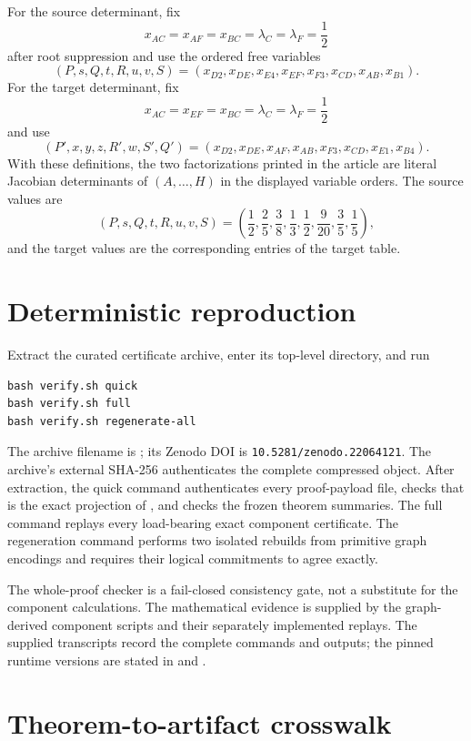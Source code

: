 \documentclass[11pt]{article}
\begin{document}
For the source determinant, fix
\[
x_{AC}=x_{AF}=x_{BC}=\lambda_C=\lambda_F=\frac12
\]
after root suppression and use the ordered free variables
\[
(P,s,Q,t,R,u,v,S)=
(x_{D2},x_{DE},x_{E4},x_{EF},x_{F3},x_{CD},x_{AB},x_{B1}).
\]
For the target determinant, fix
\[
x_{AC}=x_{EF}=x_{BC}=\lambda_C=\lambda_F=\frac12
\]
and use
\[
(P',x,y,z,R',w,S',Q')=
(x_{D2},x_{DE},x_{AF},x_{AB},x_{F3},x_{CD},x_{E1},x_{B4}).
\]
With these definitions, the two factorizations printed in the article are
literal Jacobian determinants of $(A,\ldots,H)$ in the displayed variable
orders.  The source values are
\[
(P,s,Q,t,R,u,v,S)=
\left(\frac12,\frac25,\frac38,\frac13,
\frac12,\frac9{20},\frac35,\frac15\right),
\]
and the target values are the corresponding entries of the target table.

\section{Deterministic reproduction}

Extract the curated certificate archive, enter its top-level directory, and
run
\begin{verbatim}
bash verify.sh quick
bash verify.sh full
bash verify.sh regenerate-all
\end{verbatim}
The archive filename is
; its Zenodo DOI
is \texttt{10.5281/zenodo.22064121}.  The archive's external SHA-256
authenticates the complete compressed object.  After extraction, the quick
command authenticates every proof-payload file, checks that
 is the exact projection of
, and checks the frozen theorem summaries.
The full command replays every load-bearing exact component certificate.  The
regeneration command performs two isolated rebuilds from primitive graph
encodings and requires their logical commitments to agree exactly.

The whole-proof checker is a fail-closed consistency gate, not a substitute
for the component calculations.  The mathematical evidence is supplied by
the graph-derived component scripts and their separately implemented
replays.  The supplied transcripts record the complete commands and outputs;
the pinned runtime versions are stated in
 and
.

\section{Theorem-to-artifact crosswalk}
\end{document}
